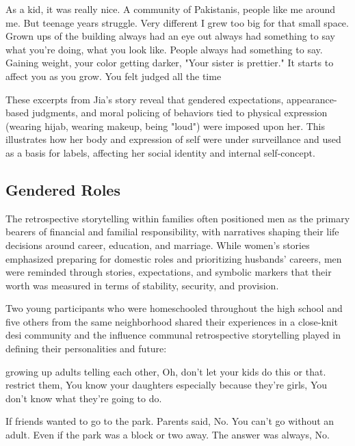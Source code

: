 \begin{FoundPoem}
As a kid,	 it was really nice. 
A community of Pakistanis, people like me around me. 
But teenage years 
 struggle. 
Very different 	 	
 I grew too big 		for that small space. 
Grown ups  of the building         
always had an eye out 
always had something to say
what you’re doing, 
what you look like. 
People always had something to say. 
Gaining weight, 
your color getting darker, 
"Your sister is prettier."
It starts to affect you as you grow.
 You felt judged all the time
\end{FoundPoem}

These excerpts from Jia’s story reveal that gendered expectations, appearance-based judgments, and moral policing of behaviors tied to physical expression (wearing hijab, wearing makeup, being "loud") were imposed upon her. This illustrates how her body and expression of self were under surveillance and used as a basis for labels, affecting her social identity and internal self-concept.

\subsection{Gendered Roles}

The retrospective storytelling within families often positioned men as the primary bearers of financial and familial responsibility, with narratives shaping their life decisions around career, education, and marriage. While women’s stories emphasized preparing for domestic roles and prioritizing husbands’ careers, men were reminded through stories, expectations, and symbolic markers that their worth was measured in terms of stability, security, and provision. 

Two young participants who were homeschooled throughout the high school and five others from the same neighborhood shared their experiences in a close-knit desi community and the influence communal retrospective storytelling played in defining their personalities and future:

\begin{FoundPoem}
growing up 
adults telling each other,
Oh, don't let your kids do this or that.
restrict them,  
You know your daughters
especially because they're girls, 
You don't know what they're going to do.

If friends wanted to go to the park.
Parents said, No. You can’t go without an adult.
Even if the park was a block or two away.
The answer was always, No.
\end{FoundPoem}

